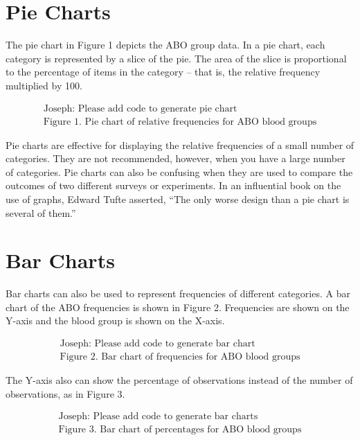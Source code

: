\documentclass[
]{book}
\begin{document}
\hypertarget{pie-charts}{%
\section{Pie Charts}\label{pie-charts}}

The pie chart in Figure 1 depicts the ABO group data. In a pie chart,
each category is represented by a slice of the pie. The area of the slice is
proportional to the percentage of items in the category -- that is, the
relative frequency multiplied by 100.

\[
\begin{array}{c}
\mbox{Joseph: Please add code to generate pie chart} \\[.1in]
\mbox{Figure 1. Pie chart of relative frequencies for ABO blood groups}
\end{array}
\]

Pie charts are effective for displaying the relative frequencies of a small
number of categories. They are not recommended, however, when you have a large
number of categories. Pie charts can also be confusing when they are used to
compare the outcomes of two different surveys or experiments. In an influential
book on the use of graphs, Edward Tufte asserted, ``The only worse design than
a pie chart is several of them.''

\hypertarget{bar-charts}{%
\section{Bar Charts}\label{bar-charts}}

Bar charts can also be used to represent frequencies of different categories.
A bar chart of the ABO frequencies is shown in Figure 2. Frequencies are shown
on the Y-axis and the blood group is shown on the X-axis.

\[
\begin{array}{c}
\mbox{Joseph: Please add code to generate bar chart} \\[.1in]
\mbox{Figure 2. Bar chart of frequencies for ABO blood groups}
\end{array}
\]

The Y-axis also can show the percentage of observations
instead of the number of observations, as in Figure 3.

\[
\begin{array}{c}
\mbox{Joseph: Please add code to generate bar charts} \\[.1in]
\mbox{Figure 3. Bar chart of percentages for ABO blood groups}
\end{array}
\]
\end{document}
